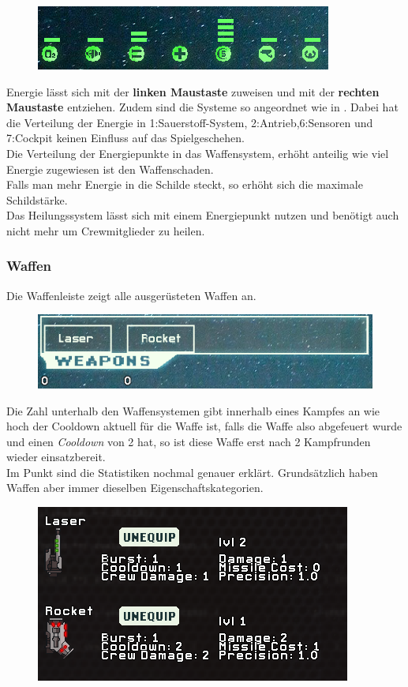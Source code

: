 \documentclass[fontsize=12pt,paper=a4,twoside]{scrartcl}
\begin{document}
\begin{figure}[H]
\centering
\includegraphics[width=0.7\linewidth]{DasSpiel/Ui/systems.png}
\end{figure} 

Energie lässt sich mit der \textbf{linken Maustaste} zuweisen und mit der \textbf{rechten Maustaste} entziehen.
Zudem sind die Systeme so angeordnet wie in . Dabei hat die Verteilung der Energie in 1:Sauerstoff-System, 2:Antrieb,6:Sensoren und 7:Cockpit keinen Einfluss auf das Spielgeschehen.
\\
Die Verteilung der Energiepunkte in das Waffensystem, erhöht anteilig wie viel Energie zugewiesen ist den Waffenschaden.
\\
Falls man mehr Energie in die Schilde steckt, so erhöht sich die maximale Schildstärke.
\\
Das Heilungssystem lässt sich mit einem Energiepunkt nutzen und benötigt auch nicht mehr um Crewmitglieder zu heilen. 

\subsubsection{Waffen}
Die Waffenleiste zeigt alle ausgerüsteten Waffen an.

\begin{figure}[H]
\centering
\includegraphics[width=0.7\linewidth]{DasSpiel/Ui/weapons.png}
\end{figure} 
Die Zahl unterhalb den Waffensystemen gibt innerhalb eines Kampfes an wie hoch der Cooldown aktuell für die Waffe ist, falls die Waffe also abgefeuert wurde und einen \textit{Cooldown} von 2 hat, so ist diese Waffe erst nach 2 Kampfrunden wieder einsatzbereit.
\\

Im Punkt  sind die Statistiken nochmal genauer erklärt. Grundsätzlich haben Waffen aber immer dieselben Eigenschaftskategorien.
\begin{figure}[H]
\centering
\includegraphics[width=0.8\linewidth]{DasSpiel/Ui/Weapon_Stats.png}
\end{figure} 
\end{document}
